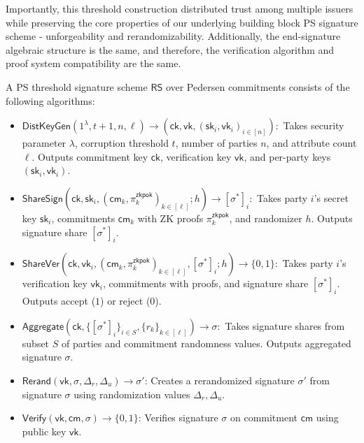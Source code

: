 Importantly, this threshold construction distributed trust among multiple issuers while preserving the core properties of our underlying building block PS signature scheme - unforgeability and rerandomizability. Additionally, the end-signature algebraic structure is the same, and therefore, the verification algorithm and proof system compatibility are the same.


\begin{definition}
A PS threshold signature scheme $\mathsf{RS}$ over Pedersen commitments consists of the following algorithms:
\begin{itemize}
    \item $\mathsf{DistKeyGen}(1^{\lambda}, t+1, n, \ell) \to (\mathsf{ck}, \mathsf{vk}, (\mathsf{sk}_i, \mathsf{vk}_i)_{i \in [n]}):$ Takes security parameter $\lambda$, corruption threshold $t$, number of parties $n$, and attribute count $\ell$. Outputs commitment key $\mathsf{ck}$, verification key $\mathsf{vk}$, and per-party keys $(\mathsf{sk}_i, \mathsf{vk}_i)$.
    
    \item $\mathsf{ShareSign}(\mathsf{ck}, \mathsf{sk}_i, (\mathsf{cm}_k, \pi_k^{\mathsf{zkpok}})_{k \in [\ell]}; h) \to [\sigma^*]_i:$ Takes party $i$'s secret key $\mathsf{sk}_i$, commitments $\mathsf{cm}_k$ with ZK proofs $\pi_k^{\mathsf{zkpok}}$, and randomizer $h$. Outputs signature share $[\sigma^*]_i$.
    
    \item $\mathsf{ShareVer}(\mathsf{ck}, \mathsf{vk}_i, (\mathsf{cm}_k, \pi_k^{\mathsf{zkpok}})_{k \in [\ell]}, [\sigma^*]_i; h) \to \{0,1\}:$ Takes party $i$'s verification key $\mathsf{vk}_i$, commitments with proofs, and signature share $[\sigma^*]_i$. Outputs accept ($1$) or reject ($0$).
    
    \item $\mathsf{Aggregate}(\mathsf{ck}, \{[\sigma^*]_i\}_{i \in S}, \{r_k\}_{k \in [\ell]}) \to \sigma:$ Takes signature shares from subset $S$ of parties and commitment randomness values. Outputs aggregated signature $\sigma$.

    \item $\mathsf{Rerand}(\mathsf{vk}, \sigma, \Delta_r, \Delta_u) \rightarrow \sigma'$: Creates a rerandomized signature $\sigma'$ from signature $\sigma$ using randomization values $\Delta_r, \Delta_u$.
    
    \item $\mathsf{Verify}(\mathsf{vk}, \mathsf{cm}, \sigma) \rightarrow \{0,1\}$: Verifies signature $\sigma$ on commitment $\mathsf{cm}$ using public key $\mathsf{vk}$.
    
\end{itemize}
\end{definition}




